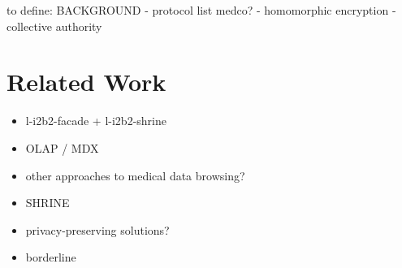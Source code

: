 
to define: BACKGROUND
- protocol list medco?
- homomorphic encryption
- collective authority
\section{Related Work}

\begin{itemize}
    \item l-i2b2-facade + l-i2b2-shrine
    \item OLAP / MDX
    \item other approaches to medical data browsing?
    \item SHRINE
    \item privacy-preserving solutions?
    \item borderline
\end{itemize}




